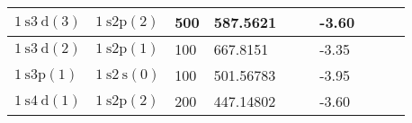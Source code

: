 \begin{tabular}{|l|l|l|l|l|l|l|l|l|l|}
    \hline $1 \mathrm{~s} 3 \mathrm{~d}(3)$ & $1 \mathrm{~s} 2 \mathrm{p}(2)$  & 500                 & 587.5621                                 &                                  &                              & -3.60                        &                                          &   & \\
    \hline $1 \mathrm{~s} 3 \mathrm{~d}(2)$ & $1 \mathrm{~s} 2 \mathrm{p}(1)$  & 100                 & 667.8151                                 &                                  &                              & -3.35                        &                                          &     \\
    \hline $1 \mathrm{~s} 3 \mathrm{p}(1)$  & $1 \mathrm{~s} 2 \mathrm{~s}(0)$ & 100                 & 501.56783                                &                                  &                              & -3.95                        &                                          &   & \\
    \hline $1 \mathrm{~s} 4 \mathrm{~d}(1)$ & $1 \mathrm{~s} 2 \mathrm{p}(2)$  & 200                 & 447.14802                                &                                  &                              & -3.60                        &                                          &   & \\
    \hline
\end{tabular}